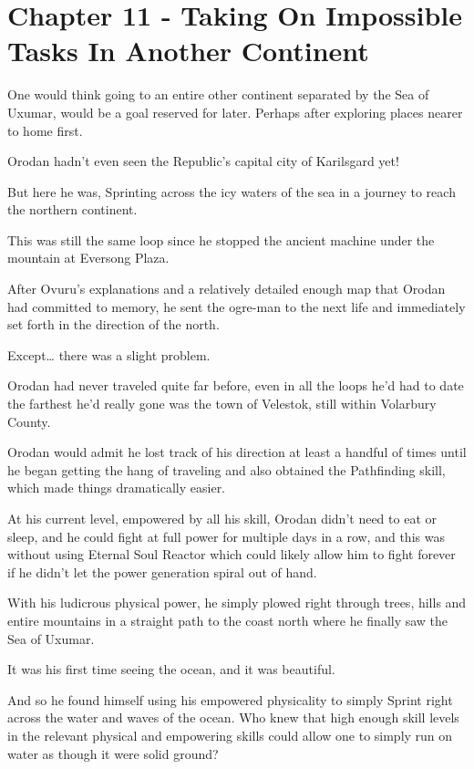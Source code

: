\documentclass[a4paper,10pt]{book}
\begin{document}
\section*{Chapter 11 - Taking On Impossible Tasks In Another Continent}
%
\par
One would think going to an entire other continent separated by the Sea of Uxumar, would be a goal reserved for later. Perhaps after exploring places nearer to home first.\par
Orodan hadn’t even seen the Republic’s capital city of Karilsgard yet!\par
But here he was, Sprinting across the icy waters of the sea in a journey to reach the northern continent.\par
This was still the same loop since he stopped the ancient machine under the mountain at Eversong Plaza.\par
After Ovuru’s explanations and a relatively detailed enough map that Orodan had committed to memory, he sent the ogre-man to the next life and immediately set forth in the direction of the north.\par
Except… there was a slight problem.\par
Orodan had never traveled quite far before, even in all the loops he’d had to date the farthest he’d really gone was the town of Velestok, still within Volarbury County.\par
Orodan would admit he lost track of his direction at least a handful of times until he began getting the hang of traveling and also obtained the Pathfinding skill, which made things dramatically easier.\par
At his current level, empowered by all his skill, Orodan didn’t need to eat or sleep, and he could fight at full power for multiple days in a row, and this was without using Eternal Soul Reactor which could likely allow him to fight forever if he didn’t let the power generation spiral out of hand.\par
With his ludicrous physical power, he simply plowed right through trees, hills and entire mountains in a straight path to the coast north where he finally saw the Sea of Uxumar.\par
It was his first time seeing the ocean, and it was beautiful.\par
And so he found himself using his empowered physicality to simply Sprint right across the water and waves of the ocean. Who knew that high enough skill levels in the relevant physical and empowering skills could allow one to simply run on water as though it were solid ground?\par
\end{document}
